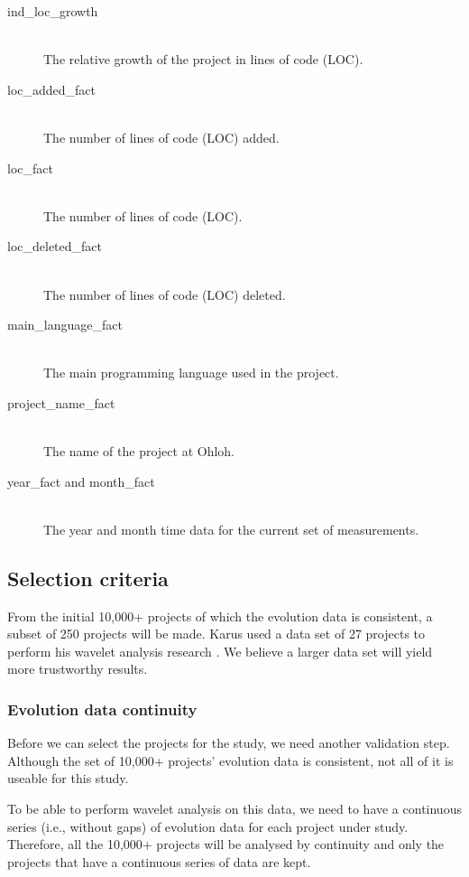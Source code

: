 \begin{description}
	\item[ind\_loc\_growth] \hfill \\
	The relative growth of the project in lines of code (LOC).

	\item[loc\_added\_fact] \hfill \\
	The number of lines of code (LOC) added.

	\item[loc\_fact] \hfill \\
	The number of lines of code (LOC).

	\item[loc\_deleted\_fact] \hfill \\
	The number of lines of code (LOC) deleted.

	\item[main\_language\_fact] \hfill \\
	The main programming language used in the project.

	\item[project\_name\_fact] \hfill \\
	The name of the project at Ohloh.

	\item[year\_fact and month\_fact] \hfill \\
	The year and month time data for the current set of measurements.
\end{description}

\subsection{Selection criteria}

From the initial 10,000+ projects of which the evolution data is consistent, a
subset of 250 projects will be made. Karus used a data set of 27 projects to
perform his wavelet analysis research \cite{karus2013}. We believe a larger
data set will yield more trustworthy results.

\subsubsection{Evolution data continuity}
Before we can select the projects for the study, we need another validation
step. Although the set of 10,000+ projects' evolution data is consistent, not
all of it is useable for this study.

To be able to perform wavelet analysis on this data, we need to have a
continuous series (i.e., without gaps) of evolution data for each project under
study. Therefore, all the 10,000+ projects will be analysed by continuity and
only the projects that have a continuous series of data are kept.

